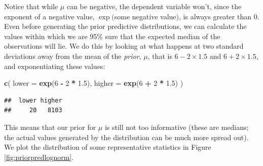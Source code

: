 \documentclass[12pt,]{krantz}
\newenvironment{Shaded}{\begin{snugshade}}{\end{snugshade}}
\newcommand{\DataTypeTok}[1]{\textcolor[rgb]{0.13,0.29,0.53}{#1}}
\newcommand{\DecValTok}[1]{\textcolor[rgb]{0.00,0.00,0.81}{#1}}
\newcommand{\FloatTok}[1]{\textcolor[rgb]{0.00,0.00,0.81}{#1}}
\newcommand{\KeywordTok}[1]{\textcolor[rgb]{0.13,0.29,0.53}{\textbf{#1}}}
\newcommand{\NormalTok}[1]{#1}
\newcommand{\OperatorTok}[1]{\textcolor[rgb]{0.81,0.36,0.00}{\textbf{#1}}}
\newcommand{\StringTok}[1]{\textcolor[rgb]{0.31,0.60,0.02}{#1}}
\theoremstyle{definition}
\theoremstyle{definition}
\theoremstyle{definition}
\theoremstyle{remark}
\begin{document}
Notice that while \(\mu\) can be negative, the dependent variable won't, since the exponent of a negative value, \(\exp(\)some negative value\()\), is always greater than \(0\). Even before generating the prior predictive distributions, we can calculate the values within which we are 95\% sure that the expected median of the observations will lie. We do this by looking at what happens at two standard deviations away from the mean of the \emph{prior}, \(\mu\), that is \(6 - 2\times 1.5\) and \(6 + 2\times 1.5\), and exponentiating these values:

\begin{Shaded}
\begin{Highlighting}[]
\KeywordTok{c}\NormalTok{(}
  \DataTypeTok{lower =} \KeywordTok{exp}\NormalTok{(}\DecValTok{6} \OperatorTok{-}\StringTok{ }\DecValTok{2} \OperatorTok{*}\StringTok{ }\FloatTok{1.5}\NormalTok{),}
  \DataTypeTok{higher =} \KeywordTok{exp}\NormalTok{(}\DecValTok{6} \OperatorTok{+}\StringTok{ }\DecValTok{2} \OperatorTok{*}\StringTok{ }\FloatTok{1.5}\NormalTok{)}
\NormalTok{)}
\end{Highlighting}
\end{Shaded}

\begin{verbatim}
##  lower higher 
##     20   8103
\end{verbatim}

This means that our prior for \(\mu\) is still not too informative (these are medians; the actual values generated by the distribution can be much more spread out). We plot the distribution of some representative statistics in Figure \ref{fig:priorpredlognorm}.
\end{document}

